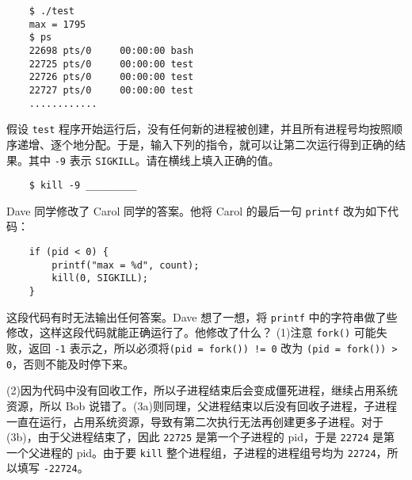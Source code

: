 \begin{problems}
                \begin{verbatim}
    $ ./test
    max = 1795
    $ ps
    22698 pts/0     00:00:00 bash
    22725 pts/0     00:00:00 test
    22726 pts/0     00:00:00 test
    22727 pts/0     00:00:00 test
    ............
                \end{verbatim}
                假设 \verb|test| 程序开始运行后，没有任何新的进程被创建，并且所有进程号均按照顺序递增、逐个地分配。于是，输入下列的指令，就可以让第二次运行得到正确的结果。其中 \verb|-9| 表示 \verb|SIGKILL|。请在横线上填入正确的值。
                \begin{verbatim}
    $ kill -9 _________
                \end{verbatim}
            \qn Dave 同学修改了 Carol 同学的答案。他将 Carol 的最后一句 \verb|printf| 改为如下代码：
            \begin{verbatim}
    if (pid < 0) {
        printf("max = %d", count);
        kill(0, SIGKILL);
    }
            \end{verbatim}
            这段代码有时无法输出任何答案。Dave 想了一想，将 \verb|printf| 中的字符串做了些修改，这样这段代码就能正确运行了。他修改了什么？
        \sol (1)注意 \verb|fork()| 可能失败，返回 \verb|-1| 表示之，所以必须将\verb|(pid = fork()) != 0| 改为 \verb|(pid = fork()) > 0|，否则不能及时停下来。
        
        (2)因为代码中没有回收工作，所以子进程结束后会变成僵死进程，继续占用系统资源，所以 Bob 说错了。(3a)则同理，父进程结束以后没有回收子进程，子进程一直在运行，占用系统资源，导致有第二次执行无法再创建更多子进程。对于(3b)，由于父进程结束了，因此 \verb|22725| 是第一个子进程的 pid，于是 \verb|22724| 是第一个父进程的 pid。由于要 \verb|kill| 整个进程组，子进程的进程组号均为 \verb|22724|，所以填写 \verb|-22724|。
        

\end{problems}
